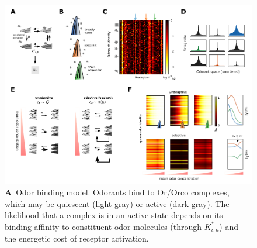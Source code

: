 



\begin{figure}[!tb]
	\centering
	\begin{subfigure}[t]{0.85\linewidth}
		\label{fig:tuning_curves_a}
	\end{subfigure}
	\begin{subfigure}[t]{0\linewidth}
		\label{fig:tuning_curves_b}
	\end{subfigure}
	\begin{subfigure}[t]{0\linewidth}
		\label{fig:tuning_curves_c}
	\end{subfigure}
	\begin{subfigure}[t]{0\linewidth}
		\label{fig:tuning_curves_d}
	\end{subfigure}
	\begin{subfigure}[t]{0\linewidth}
		\label{fig:tuning_curves_e}
	\end{subfigure}
	\begin{subfigure}[t]{0\linewidth}
		\label{fig:tuning_curves_f}
	\end{subfigure}
	\includegraphics[width=\textwidth]{figures/Figures_tuning_curve}
	\caption{\footnotesize{
		\textbf{A}~Odor binding model. Odorants bind to Or/Orco complexes, which may be quiescent (light gray) or active (dark gray). The likelihood that a complex is in an active state depends on its binding affinity to constituent odor molecules (through $K^*_{i, a}$) and the energetic cost of receptor activation. 
}}
\end{figure}
